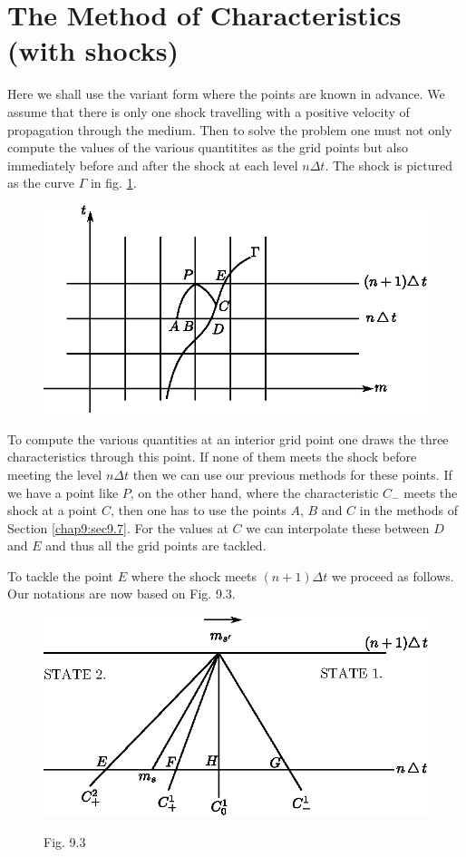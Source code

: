 \section{The Method of Characteristics (with shocks)}\label{chap9:sec9.8}

Here we shall use the variant form where the points are known in
advance. We assume that there is only one shock travelling with a
positive velocity of propagation through the medium. Then to solve the
problem one must not only compute the values of the various
quantitites as the grid points but also immediately before and after
the shock at each level $n \Delta t$. The shock is pictured as the
curve $\Gamma$ in fig. \ref{c9:fig9.2}.  

\begin{figure}[H]
\centering
\includegraphics{figures/fig52-9.2.eps}
\caption{}\label{c9:fig9.2}
\end{figure}\pageoriginale

To compute the various quantities at an interior grid point one draws the three characteristics through this point. If none of them meets the shock before meeting the level $n\Delta t$ then we can use our previous methods for these points. If we have a point like $P$, on the other hand, where the characteristic $C_-$ meets the shock at a point $C$, then one has to use the points $A$, $B$ and $C$ in the methods of Section \ref{chap9:sec9.7}. For the values at $C$ we can interpolate these between $D$ and $E$ and thus all the grid points are tackled. 

To tackle the point $E$ where the shock meets $(n+1) \Delta t$ we proceed as follows. Our notations are now based on Fig. 9.3.

\begin{figure}[H]
\centering
\includegraphics{figures/fig52-9.3.eps}
\centerline{Fig. 9.3}
\end{figure}\pageoriginale 

